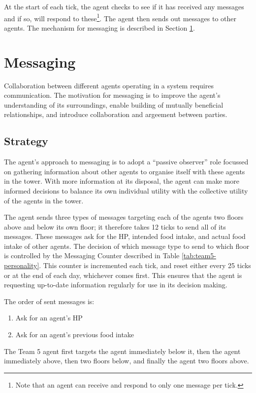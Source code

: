 At the start of each tick, the agent checks to see if it has received any messages and if so, will respond to these\footnote{Note that an agent can receive and respond to only one message per tick.}. The agent then sends out messages to other agents. The mechanism for messaging is described in Section \ref{sec:team5-messaging}.

\section{Messaging}\label{sec:team5-messaging}
Collaboration between different agents operating in a system requires communication. The motivation for messaging is to improve the agent's understanding of its surroundings, enable building of mutually beneficial relationships, and introduce collaboration and argeement between parties.

\subsection*{Strategy}\label{sec:team5-messaging-strategy}
The agent's approach to messaging is to adopt a ``passive observer'' role focussed on gathering information about other agents to organise itself with these agents in the tower. With more information at its disposal, the agent can make more informed decisions to balance its own individual utility with the collective utility of the agents in the tower.

The agent sends three types of messages targeting each of the agents two floors above and below its own floor; it therefore takes 12 ticks to send all of its messages. These messages ask for the HP, intended food intake, and actual food intake of other agents. The decision of which message type to send to which floor is controlled by the Messaging Counter described in Table \ref{tab:team5-personality}. This counter is incremented each tick, and reset either every 25 ticks or at the end of each day, whichever comes first. This ensures that the agent is requesting up-to-date information regularly for use in its decision making.

The order of sent messages is:
\begin{enumerate}
    \item Ask for an agent's HP
    \item Ask for an agent's previous food intake
\end{enumerate}
The Team 5 agent first targets the agent immediately below it, then the agent immediately above, then two floors below, and finally the agent two floors above.

